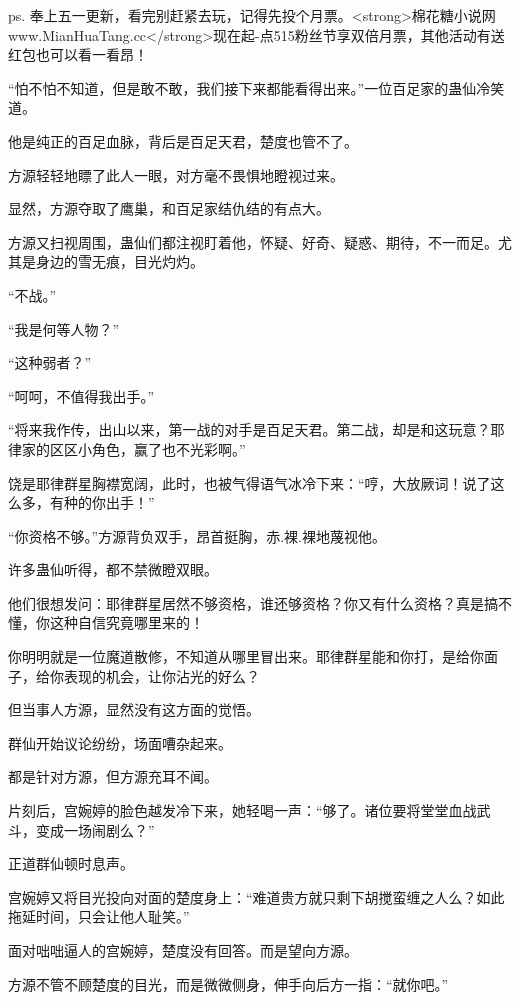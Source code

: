 
\begin{this_body}

ps. 奉上五一更新，看完别赶紧去玩，记得先投个月票。<strong>棉花糖小说网www.MianHuaTang.cc</strong>现在起-点515粉丝节享双倍月票，其他活动有送红包也可以看一看昂！

“怕不怕不知道，但是敢不敢，我们接下来都能看得出来。”一位百足家的蛊仙冷笑道。

他是纯正的百足血脉，背后是百足天君，楚度也管不了。

方源轻轻地瞟了此人一眼，对方毫不畏惧地瞪视过来。

显然，方源夺取了鹰巢，和百足家结仇结的有点大。

方源又扫视周围，蛊仙们都注视盯着他，怀疑、好奇、疑惑、期待，不一而足。尤其是身边的雪无痕，目光灼灼。

“不战。”

“我是何等人物？”

“这种弱者？”

“呵呵，不值得我出手。”

“将来我作传，出山以来，第一战的对手是百足天君。第二战，却是和这玩意？耶律家的区区小角色，赢了也不光彩啊。”

饶是耶律群星胸襟宽阔，此时，也被气得语气冰冷下来：“哼，大放厥词！说了这么多，有种的你出手！”

“你资格不够。”方源背负双手，昂首挺胸，赤.裸.裸地蔑视他。

许多蛊仙听得，都不禁微瞪双眼。

他们很想发问：耶律群星居然不够资格，谁还够资格？你又有什么资格？真是搞不懂，你这种自信究竟哪里来的！

你明明就是一位魔道散修，不知道从哪里冒出来。耶律群星能和你打，是给你面子，给你表现的机会，让你沾光的好么？

但当事人方源，显然没有这方面的觉悟。

群仙开始议论纷纷，场面嘈杂起来。

都是针对方源，但方源充耳不闻。

片刻后，宫婉婷的脸色越发冷下来，她轻喝一声：“够了。诸位要将堂堂血战武斗，变成一场闹剧么？”

正道群仙顿时息声。

宫婉婷又将目光投向对面的楚度身上：“难道贵方就只剩下胡搅蛮缠之人么？如此拖延时间，只会让他人耻笑。”

面对咄咄逼人的宫婉婷，楚度没有回答。而是望向方源。

方源不管不顾楚度的目光，而是微微侧身，伸手向后方一指：“就你吧。”


\end{this_body}
